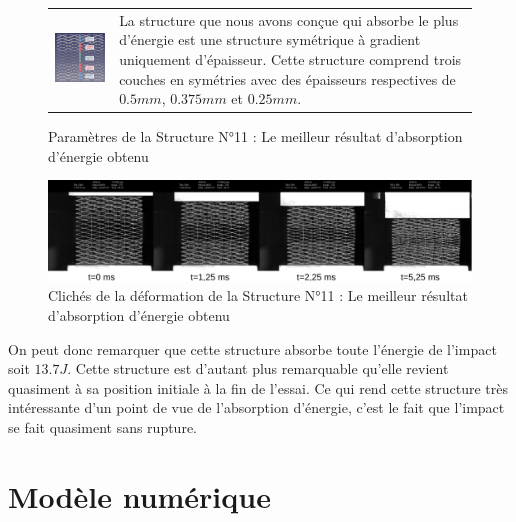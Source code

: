 \documentclass[a4paper]{article}
\begin{document}
	\begin{figure}[H]
		\centering
		\begin{tabular}{m{7cm}m{8cm}}
			\includegraphics[width=7cm]{Images/7/7_4/7_4_9/11.pdf} & La structure que nous avons conçue qui absorbe le plus d'énergie est une structure symétrique à gradient uniquement d'épaisseur. Cette structure comprend trois couches en symétries avec des épaisseurs respectives de $0.5mm$, $0.375mm$ et $0.25mm$.\\
		\end{tabular}
		\caption{Paramètres de la Structure N°11 : Le meilleur résultat d'absorption d'énergie obtenu}
	\end{figure}
	
	\begin{figure}[H]
		\centering
		\includegraphics[width=16cm]{Images/7/7_4/7_4_9/instants.pdf}
		\caption{Clichés de la déformation de la Structure N°11 : Le meilleur résultat d'absorption d'énergie obtenu}
	\end{figure}
	
	\hspace{0.5cm}On peut donc remarquer que cette structure absorbe toute l'énergie de l'impact soit $13.7J$. Cette structure est d'autant plus remarquable qu'elle revient quasiment à sa position initiale à la fin de l'essai. Ce qui rend cette structure très intéressante d'un point de vue de l'absorption d'énergie, c'est le fait que l'impact se fait quasiment sans rupture.
	\newpage
	
	\section{Modèle numérique}
\end{document}
